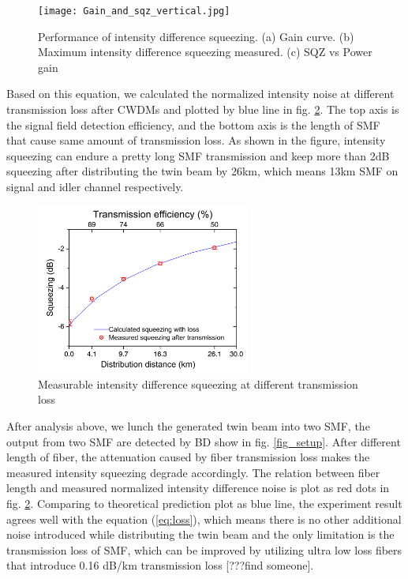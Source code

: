 \documentclass[9pt,twocolumn,twoside]{osajnl}
\begin{document}
\begin{figure}[htbp]
\centering
\texttt{[image: Gain\_and\_sqz\_vertical.jpg]}%
\caption{Performance of intensity difference squeezing. (a) Gain curve. (b) Maximum intensity difference squeezing measured. (c) SQZ vs Power gain}
\label{fig2_OPA}
\end{figure}

Based on this equation, we calculated the normalized intensity noise at different transmission loss after CWDMs and plotted by blue line in fig. \ref{fig_loss}. The top axis is the signal field detection efficiency, and the bottom axis is the length of SMF that cause same amount of transmission loss. As shown in the figure, intensity squeezing can endure a pretty long SMF transmission and keep more than 2dB squeezing after distributing the twin beam by 26km, which means 13km SMF on signal and idler channel respectively.

\begin{figure}[htbp]
\centering
\includegraphics[width=7cm]{Sqz_vs_Length_dB_color.jpg}
\caption{Measurable intensity difference squeezing at different transmission loss}
\label{fig_loss}
\end{figure}

After analysis above, we lunch the generated twin beam into two SMF, the output from two SMF are detected by BD show in fig. \ref{fig_setup}.
After different length of fiber, the attenuation caused by fiber transmission loss makes the measured intensity squeezing degrade accordingly.
The relation between fiber length and measured normalized intensity difference noise is plot as red dots in fig. \ref{fig_loss}.
Comparing to theoretical prediction plot as blue line, the experiment result agrees well with the equation (\ref{eq:loss}), which means there is no other additional noise introduced while distributing the twin beam and the only limitation is the transmission loss of SMF, which can be improved by utilizing ultra low loss fibers that introduce 0.16 dB/km transmission loss [???find someone].
\end{document}
